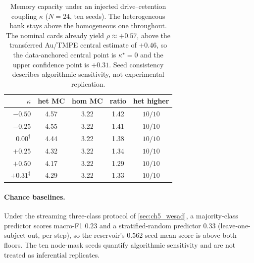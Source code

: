 \begin{table}[t]
  \centering
  \caption[Coupling-sensitivity control]{Memory capacity under an injected drive--retention coupling $\kappa$ ($N=24$, ten seeds). The heterogeneous bank stays above the homogeneous one throughout. The nominal cards already yield $\rho\approx+0.57$, above the transferred Au/TMPE central estimate of $+0.46$, so the data-anchored central point is $\kappa^{\star}=0$ and the upper confidence point is $+0.31$. Seed consistency describes algorithmic sensitivity, not experimental replication.}
  \label{tab:ch5_coupling}
  \footnotesize
  \setlength{\tabcolsep}{8pt}
  \begin{tabular}{rcccc}
    \toprule
    $\kappa$ & het MC & hom MC & ratio & het higher \\
    \midrule
    $-0.50$ & 4.57 & 3.22 & 1.42 & $10/10$ \\
    $-0.25$ & 4.55 & 3.22 & 1.41 & $10/10$ \\
    $\phantom{-}0.00^{\dagger}$ & 4.44 & 3.22 & 1.38 & $10/10$ \\
    $+0.25$ & 4.32 & 3.22 & 1.34 & $10/10$ \\
    $+0.50$ & 4.17 & 3.22 & 1.29 & $10/10$ \\
    \midrule
    $+0.31^{\ddagger}$ & 4.29 & 3.22 & 1.33 & $10/10$ \\
    \bottomrule
  \end{tabular}
\end{table}

\paragraph{Chance baselines.} Under the streaming three-class protocol of
\cref{sec:ch5_wesad}, a majority-class predictor scores macro-F1 $0.23$ and a
stratified-random predictor $0.33$ (leave-one-subject-out, per step), so the
reservoir's $0.562$ seed-mean score is above both floors. The ten node-mask seeds
quantify algorithmic sensitivity and are not treated as inferential replicates.

